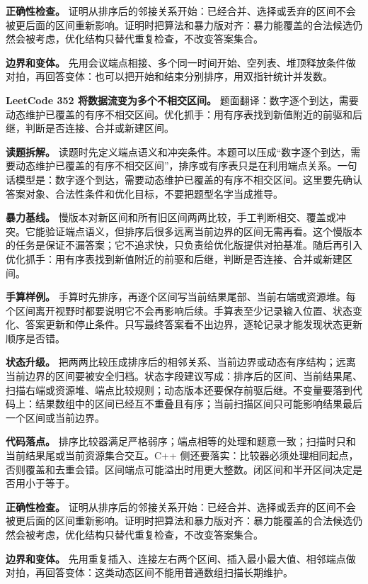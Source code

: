 \textbf{正确性检查。} 证明从排序后的邻接关系开始：已经合并、选择或丢弃的区间不会被更后面的区间重新影响。证明时把算法和暴力版对齐：暴力能覆盖的合法候选仍然会被考虑，优化结构只替代重复检查，不改变答案集合。

\textbf{边界和变体。} 先用会议端点相接、多个同一时间开始、空列表、堆顶释放条件做对拍，再回答变体：也可以把开始和结束分别排序，用双指针统计并发数。

\noindent\textbf{LeetCode 352 将数据流变为多个不相交区间。} 题面翻译：数字逐个到达，需要动态维护已覆盖的有序不相交区间。优化抓手：用有序表找到新值附近的前驱和后继，判断是否连接、合并或新建区间。

\textbf{读题拆解。} 读题时先定义端点语义和冲突条件。本题可以压成“数字逐个到达，需要动态维护已覆盖的有序不相交区间”，排序或有序表只是在利用端点关系。一句话模型是：数字逐个到达，需要动态维护已覆盖的有序不相交区间。这里要先确认答案对象、合法性条件和优化目标，不要把题型名字当成推导。

\textbf{暴力基线。} 慢版本对新区间和所有旧区间两两比较，手工判断相交、覆盖或冲突。它能验证端点语义，但排序后很多远离当前边界的区间无需再看。这个慢版本的任务是保证不漏答案；它不追求快，只负责给优化版提供对拍基准。随后再引入优化抓手：用有序表找到新值附近的前驱和后继，判断是否连接、合并或新建区间。

\textbf{手算样例。} 手算时先排序，再逐个区间写当前结果尾部、当前右端或资源堆。每个区间离开视野时都要说明它不会再影响后续。手算表至少记录输入位置、状态变化、答案更新和停止条件。只写最终答案看不出边界，逐轮记录才能发现状态更新顺序是否错。

\textbf{状态升级。} 把两两比较压成排序后的相邻关系、当前边界或动态有序结构；远离当前边界的区间要被安全归档。状态字段建议写成：排序后的区间、当前结果尾、扫描右端或资源堆、端点比较规则；动态版本还要保存前驱后继。不变量要落到代码上：结果数组中的区间已经互不重叠且有序；当前扫描区间只可能影响结果最后一个区间或当前边界。

\textbf{代码落点。} 排序比较器满足严格弱序；端点相等的处理和题意一致；扫描时只和当前结果尾或当前资源集合交互。C++ 侧还要落实：比较器必须处理相同起点，否则覆盖和去重会错。区间端点可能溢出时用更大整数。闭区间和半开区间决定是否用小于等于。

\textbf{正确性检查。} 证明从排序后的邻接关系开始：已经合并、选择或丢弃的区间不会被更后面的区间重新影响。证明时把算法和暴力版对齐：暴力能覆盖的合法候选仍然会被考虑，优化结构只替代重复检查，不改变答案集合。

\textbf{边界和变体。} 先用重复插入、连接左右两个区间、插入最小最大值、相邻端点做对拍，再回答变体：这类动态区间不能用普通数组扫描长期维护。

